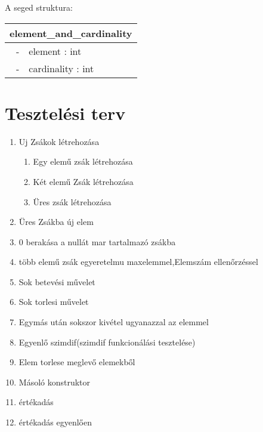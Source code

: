 \documentclass{article}
\begin{document}
        A seged struktura:
       
       
       
                \begin{tabular}{|r|l|}
            \hline
              \multicolumn{2}{c}{element\_and\_cardinality} \\
            \hline
            - & element : int\\
            - & cardinality : int\\
            \hline
        \end{tabular}
\section{Tesztelési terv}
\begin{enumerate}
    \item Uj Zsákok létrehozása
    \begin{enumerate}
        \item Egy elemű zsák létrehozása
        \item Két elemű Zsák létrehozása
        \item Üres zsák létrehozása
    \end{enumerate}
    \item Üres Zsákba új elem
    \item 0 berakása a nullát mar tartalmazó zsákba
    \item több elemű zsák egyeretelmu maxelemmel,Elemszám ellenőrzéssel
    \item Sok betevési művelet
    \item Sok torlesi művelet
    \item Egymás után sokszor kivétel ugyanazzal az elemmel
    \item Egyenlő szimdif(szimdif funkcionálási tesztelése)
    \item Elem torlese meglevő elemekből
    \item Másoló konstruktor
    \item értékadás
    \item értékadás egyenlően
\end{enumerate}
\end{document}
